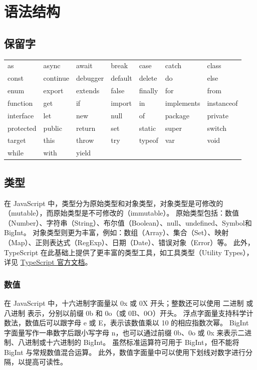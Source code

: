 \section{语法结构}
\subsection{保留字}
\begin{tabular}{lllllll}
	as        & async    & await    & break   & case    & catch      & class      \\
	const     & continue & debugger & default & delete  & do         & else       \\
	enum      & export   & extends  & false   & finally & for        & from       \\
	function  & get      & if       & import  & in      & implements & instanceof \\
	interface & let      & new      & null    & of      & package    & private    \\
	protected & public   & return   & set     & static  & super      & switch     \\
	target    & this     & throw    & try     & typeof  & var        & void       \\
	while     & with     & yield                                                  \\
\end{tabular}

\subsection{类型}
在 JavaScript 中，类型分为原始类型和对象类型，对象类型是可修改的（mutable），而原始类型是不可修改的（immutable）。
原始类型包括：数值（Number）、字符串（String）、布尔值（Boolean）、null、undefined、Symbol和BigInt。
对象类型则更为丰富，例如：数组（Array）、集合（Set）、映射（Map）、正则表达式（RegExp）、日期（Date）、错误对象（Error）等。
此外，TypeScript 在此基础上提供了更丰富的类型工具，如工具类型（Utility Types），详见
\href{https://www.typescriptlang.org/docs/handbook/utility-types.html}{TypeScript 官方文档}。

\subsubsection{数值}
在 JavaScript 中，十六进制字面量以 0x 或 0X 开头；整数还可以使用 二进制 或 八进制 表示，分别以前缀 0b 和 0o（或 0B、0O）开头。
浮点字面量支持科学计数法，数值后可以跟字母 e 或 E，表示该数值乘以 10 的相应指数次幂。
BigInt 字面量写作一串数字后跟小写字母 n，也可以通过前缀 0b、0o 或 0x 来表示二进制、八进制或十六进制的 BigInt。
虽然标准运算符可用于 BigInt，但不能将 BigInt 与常规数值混合运算。
此外，数值字面量中可以使用下划线对数字进行分隔，以提高可读性。


